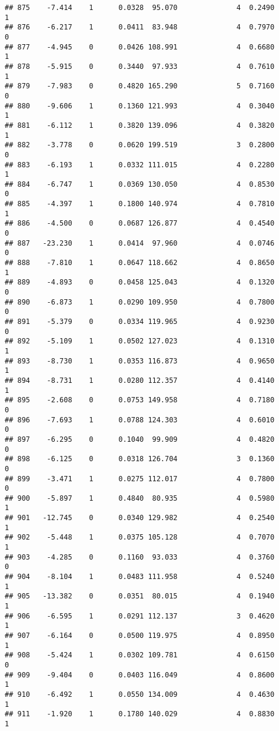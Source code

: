 \documentclass[
]{article}
\begin{document}
\begin{verbatim}
## 875    -7.414    1      0.0328  95.070              4  0.2490      1
## 876    -6.217    1      0.0411  83.948              4  0.7970      0
## 877    -4.945    0      0.0426 108.991              4  0.6680      1
## 878    -5.915    0      0.3440  97.933              4  0.7610      1
## 879    -7.983    0      0.4820 165.290              5  0.7160      0
## 880    -9.606    1      0.1360 121.993              4  0.3040      1
## 881    -6.112    1      0.3820 139.096              4  0.3820      1
## 882    -3.778    0      0.0620 199.519              3  0.2800      0
## 883    -6.193    1      0.0332 111.015              4  0.2280      1
## 884    -6.747    1      0.0369 130.050              4  0.8530      0
## 885    -4.397    1      0.1800 140.974              4  0.7810      1
## 886    -4.500    0      0.0687 126.877              4  0.4540      0
## 887   -23.230    1      0.0414  97.960              4  0.0746      0
## 888    -7.810    1      0.0647 118.662              4  0.8650      1
## 889    -4.893    0      0.0458 125.043              4  0.1320      0
## 890    -6.873    1      0.0290 109.950              4  0.7800      0
## 891    -5.379    0      0.0334 119.965              4  0.9230      0
## 892    -5.109    1      0.0502 127.023              4  0.1310      1
## 893    -8.730    1      0.0353 116.873              4  0.9650      1
## 894    -8.731    1      0.0280 112.357              4  0.4140      1
## 895    -2.608    0      0.0753 149.958              4  0.7180      0
## 896    -7.693    1      0.0788 124.303              4  0.6010      0
## 897    -6.295    0      0.1040  99.909              4  0.4820      0
## 898    -6.125    0      0.0318 126.704              3  0.1360      0
## 899    -3.471    1      0.0275 112.017              4  0.7800      0
## 900    -5.897    1      0.4840  80.935              4  0.5980      1
## 901   -12.745    0      0.0340 129.982              4  0.2540      1
## 902    -5.448    1      0.0375 105.128              4  0.7070      1
## 903    -4.285    0      0.1160  93.033              4  0.3760      0
## 904    -8.104    1      0.0483 111.958              4  0.5240      1
## 905   -13.382    0      0.0351  80.015              4  0.1940      1
## 906    -6.595    1      0.0291 112.137              3  0.4620      1
## 907    -6.164    0      0.0500 119.975              4  0.8950      1
## 908    -5.424    1      0.0302 109.781              4  0.6150      0
## 909    -9.404    0      0.0403 116.049              4  0.8600      1
## 910    -6.492    1      0.0550 134.009              4  0.4630      1
## 911    -1.920    1      0.1780 140.029              4  0.8830      1

\end{verbatim}
\end{document}
